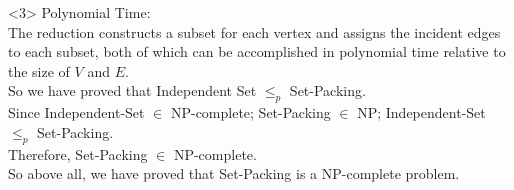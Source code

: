 <3> Polynomial Time:\\
The reduction constructs a subset for each vertex and assigns the incident edges to each subset, both of which can be accomplished in polynomial time relative to the size of \( V \) and \( E \).\\

So we have proved that Independent Set $\leq_p$ Set-Packing.\\

Since Independent-Set $\in$ NP-complete; Set-Packing $\in$ NP; Independent-Set $\leq_p$ Set-Packing.\\
Therefore, Set-Packing $\in$ NP-complete.\\

So above all, we have proved that Set-Packing is a NP-complete problem.

\newpage
